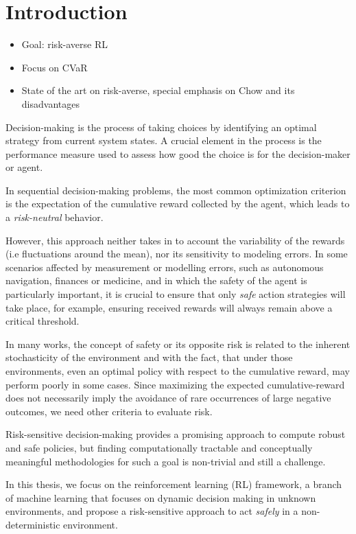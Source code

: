 \chapter{Introduction}
\label{sec:introduction}

\begin{itemize}
    \item Goal: risk-averse RL
    \item Focus on CVaR
    \item State of the art on risk-averse, special emphasis on Chow and its disadvantages
\end{itemize}

Decision-making is the process of taking choices by identifying an optimal strategy
from current system states. 
A crucial element in the process is the performance measure used
to assess how good the choice is for the decision-maker or agent.

In sequential decision-making problems, the most common optimization criterion is the 
expectation of the cumulative reward collected by the agent, which leads to a \textit{risk-neutral}
behavior.

However, this approach neither takes in to account the variability of the rewards (i.e fluctuations around the mean),
nor its sensitivity to modeling errors. 
In some scenarios affected by measurement or modelling errors, such as autonomous navigation,
finances or medicine, and in which the safety of the agent is particularly important, it is crucial to ensure that
only \textit{safe} action strategies will take place,
for example, ensuring received rewards will always remain above a critical threshold.

In many works, the concept of safety or its opposite risk is related to the inherent stochasticity of the environment
and with the fact, that under those environments, even an optimal policy with respect to the cumulative reward,
may perform poorly in some cases. Since maximizing the expected cumulative-reward does not necessarily imply 
the avoidance of rare occurrences of large negative outcomes, we need other criteria to evaluate risk. \citep{Garcia2015}

Risk-sensitive decision-making provides a promising
approach to compute robust and safe policies, but
finding computationally tractable and conceptually meaningful methodologies for such a goal is non-trivial
and still a challenge.

In this thesis, we focus on the reinforcement learning (RL) framework, a branch of machine learning
that focuses on dynamic decision making in unknown environments, and propose a risk-sensitive approach
to act \textit{safely} in a non-deterministic environment.





